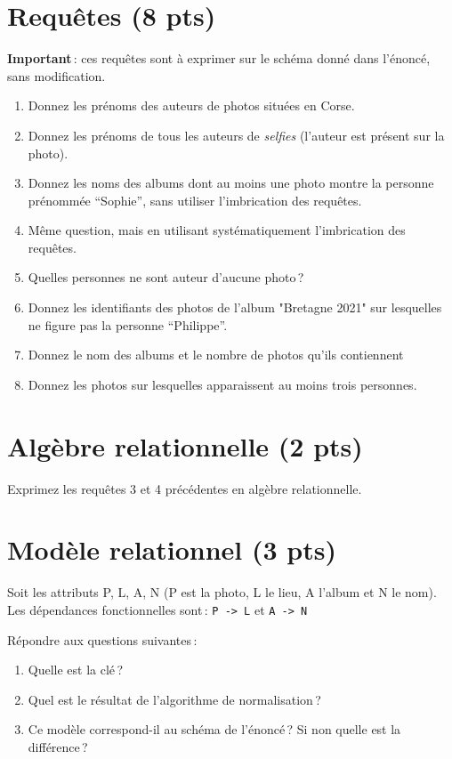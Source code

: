 \section{Requêtes (8 pts)}

\textbf{Important}\,: ces requêtes sont à exprimer
sur le schéma donné dans l'énoncé, sans modification.

\begin{enumerate}
  \item Donnez les prénoms des auteurs de photos situées en Corse.
    
  \item Donnez les prénoms de tous  les auteurs de \emph{selfies} (l'auteur est présent sur la photo).
  
  
  \item Donnez les noms des albums dont au moins une photo montre la personne prénommée ``Sophie'',
     sans utiliser l'imbrication des requêtes.
  \item Même question, mais  en utilisant systématiquement l'imbrication des requêtes.
  
  \item Quelles personnes ne sont auteur d'aucune photo\,?
  \item Donnez les identifiants des photos de l'album "Bretagne 2021" sur lesquelles ne figure
     pas la personne ``Philippe''.

  \item Donnez le nom des albums et le nombre de photos qu'ils contiennent
  
\item Donnez les photos sur lesquelles apparaissent au moins trois personnes.
  \end{enumerate}

\section{Algèbre relationnelle ({\bf 2 pts})}

Exprimez les requêtes 3 et 4 précédentes
en algèbre relationnelle.

\section{Modèle relationnel ({\bf 3 pts})}

Soit les attributs P, L, A, N  (P est la photo, L le lieu,
A l'album et N le nom). Les dépendances fonctionnelles sont\,:
\texttt{P -> L} et \texttt{A -> N}

Répondre aux questions suivantes\,: 
\begin{enumerate}
  \item Quelle est la clé\,?
  \item Quel est le résultat de l'algorithme de normalisation\,?
  \item Ce modèle correspond-il 
     au schéma de l'énoncé\,? Si non quelle est la différence\,?
\end{enumerate}